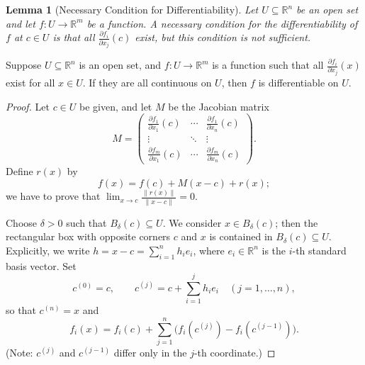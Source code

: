 \documentclass[11pt]{article}
\makeatletter
\newcounter{thmcounter}
\newenvironment{theorem}[1]{\begin{thmbox}{#1}{}}{\end{thmbox}}
\theoremstyle{quiet}
\newtheorem{lemma}[thmcounter]{Lemma}
\newtheorem{lemma}[tcb@cnt@defbox]{Lemma}
\theoremstyle{quietremark}
\makeatother
\begin{document}
\begin{lemma}[Necessary Condition for Differentiability]
Let $U\subseteq\mathbb{R}^n$ be an open set and let $f:U\to\mathbb{R}^m$ be a function. A necessary condition for the differentiability of $f$ at $c\in U$ is that all $\frac{\partial f_i}{\partial x_j}(c)$ exist, but this condition is not sufficient.
\end{lemma}

\begin{theorem}
Suppose $U\subseteq\mathbb{R}^n$ is an open set, and $f:U\to\mathbb{R}^m$ is a function such that all $\frac{\partial f_i}{\partial x_j}(x)$ exist for all $x\in U$. If they are all continuous on $U$, then $f$ is differentiable on $U$.
\end{theorem}

\begin{proof}
Let $c\in U$ be given, and let $M$ be the Jacobian matrix
\[
M=\begin{pmatrix}
\frac{\partial f_1}{\partial x_1}(c)&\cdots&\frac{\partial f_1}{\partial x_n}(c)\\
\vdots&\ddots&\vdots\\
\frac{\partial f_m}{\partial x_1}(c)&\cdots&\frac{\partial f_m}{\partial x_n}(c)
\end{pmatrix}.
\]
Define $r(x)$ by
\[
f(x)=f(c)+M(x-c)+r(x);
\]
we have to prove that $\displaystyle\lim_{x\to c}\frac{\|r(x)\|}{\|x-c\|}=0$.

Choose $\delta>0$ such that $B_\delta(c)\subseteq U$. We consider $x\in B_\delta(c)$; then the rectangular box with opposite corners $c$ and $x$ is contained in $B_\delta(c)\subseteq U$. Explicitly, we write $h=x-c=\sum_{i=1}^n h_ie_i$, where $e_i\in\mathbb{R}^n$ is the $i$-th standard basis vector. Set
\[
c^{(0)}=c,\qquad c^{(j)}=c+\sum_{i=1}^{j}h_ie_i\quad(j=1,\dots,n),
\]
so that $c^{(n)}=x$ and
\[
f_i(x)=f_i(c)+\sum_{j=1}^n\bigl(f_i(c^{(j)})-f_i(c^{(j-1)})\bigr).
\]
(Note: $c^{(j)}$ and $c^{(j-1)}$ differ only in the $j$-th coordinate.)


\end{proof}
\end{document}
